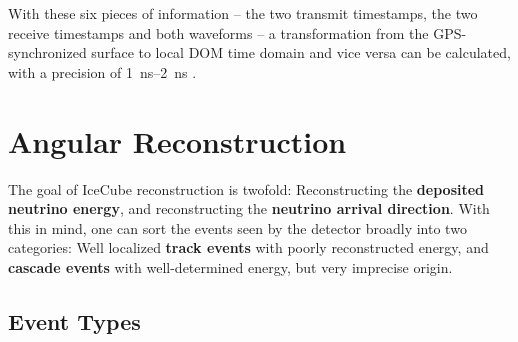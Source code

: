 With these six pieces of information -- the two transmit timestamps, the two receive timestamps and both waveforms -- a transformation from the GPS-synchronized surface to local DOM time domain and vice versa can be calculated, with a precision of \SIrange{1}{2}{\ns} \cite{Abbasi2009}.

\section{Angular Reconstruction}\label{reconstruction}

The goal of IceCube reconstruction is twofold: Reconstructing the \textbf{deposited neutrino energy}, and reconstructing the \textbf{neutrino arrival direction}. With this in mind, one can sort the events seen by the detector broadly into two categories: Well localized \textbf{track events} with poorly reconstructed energy, and \textbf{cascade events} with well-determined energy, but very imprecise origin.

\subsection{Event Types} \label{ic_event_types}

